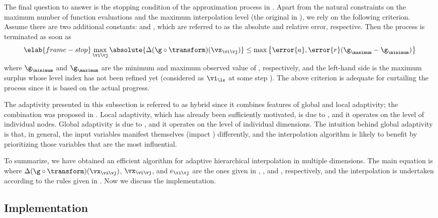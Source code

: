 The final question to answer is the stopping condition of the approximation
process in . Apart from the natural constraints on the
maximum number of function evaluations and the maximum interpolation level (the
original \ls in ), we rely on the following
criterion. Assume there are two additional constants:  and ,
which are referred to as the absolute and relative error, respective. Then the
process is terminated as soon as
\begin{equation} \elab{frame-stop}
  \max_{\vi \vj} \absolute{\Delta(\g \circ \transform)(\vx_{\vi \vj})} \leq \max \left\{ \error{a}, \error{r} (\g_\maximum - \g_\minimum) \right\}
\end{equation}
where $\g_\minimum$ and $\g_\maximum$ are the minimum and maximum observed value
of \g, respectively, and the left-hand side is the maximum surplus whose level
index has not been refined yet (considered as $\vi_{\ls}$ at some step \ls). The
above criterion is adequate for curtailing the process since it is based on the
actual progress.

The adaptivity presented in this subsection is referred to as hybrid since it
combines features of global and local adaptivity; the combination was proposed
in \cite{jakeman2012}. Local adaptivity, which has already been sufficiently
motivated, is due to \cite{ma2009}, and it operates on the level of individual
nodes. Global adaptivity is due to \cite{klimke2006}, and it operates on the
level of individual dimensions. The intuition behind global adaptivity is that,
in general, the input variables manifest themselves (impact \g) differently, and
the interpolation algorithm is likely to benefit by prioritizing those variables
that are the most influential.

To summarize, we have obtained an efficient algorithm for adaptive hierarchical
interpolation in multiple dimensions. The main equation is 
where $\Delta(\g \circ \transform)(\vx_{\vi \vj})$, $\vx_{\vi \vj}$, and $e_{\vi
\vj}$ are the ones given in ,
, and , respectively, and the interpolation
is undertaken according to the rules given in . Now we
discuss the implementation.

\subsection{Implementation}

